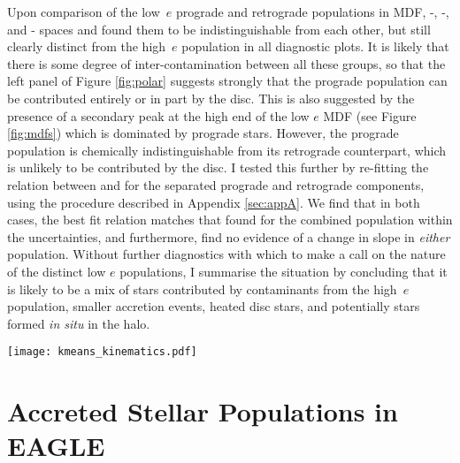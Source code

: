 Upon comparison of the low~$e$ prograde and retrograde populations in MDF,
\mgfe{}-\feh{}, \alfe{}-\feh{}, and \nife{}-\feh{} spaces and found them to be indistinguishable from each other, but still clearly
distinct from the high~$e$ population in all diagnostic plots.  It
is likely that there is some degree of inter-contamination between
all these groups, so that the left panel of Figure \ref{fig:polar}
suggests strongly that the prograde population can be contributed
entirely or in part by the disc.  This is also suggested by the
presence of a secondary peak at the high \feh{} end of the low $e$
MDF (see Figure \ref{fig:mdfs}) which is dominated by prograde
stars.  However, the prograde population is
chemically indistinguishable from its retrograde counterpart, which
is unlikely to be contributed by the disc.  I tested this further
by re-fitting the relation between \mgfe{} and \feh{} for the
separated prograde and retrograde components, using the procedure
described in Appendix \ref{sec:appA}. We find that in both cases,
the best fit relation matches that found for the combined population
within the uncertainties, and furthermore, find no evidence of a
change in slope in \emph{either} population.  Without further diagnostics
with which to make a call on the nature of the distinct low $e$
populations, I summarise the situation by concluding that it is
likely to be a mix of stars contributed by contaminants
from the high~$e$ population, smaller accretion events, heated
disc stars, and potentially stars formed {\it in situ} in the halo.

\begin{figure*} \texttt{[image: kmeans\_kinematics.pdf]}
\caption[The distribution of disc and accreted halo
populations in spherical polar coordinate planes, coloured by membership in the low and high $e$ groups]{\label{fig:polar} Distribution of disc and accreted halo
populations in spherical polar coordinate planes.  On the left
panel, the high $e$ population occupies the same locus in $v_R-v_\phi$
space (left panel) as the population identified by
\citet{2018MNRAS.478..611B}.  The low $e$ population splits into
two populations according to $v_\phi$, with one prograde and one
retrograde component, suggesting that this population may in fact
be from a mix of disc contaminants and debris from smaller satellites.
} \end{figure*}


\section{Accreted Stellar Populations in EAGLE} \label{eagle}

